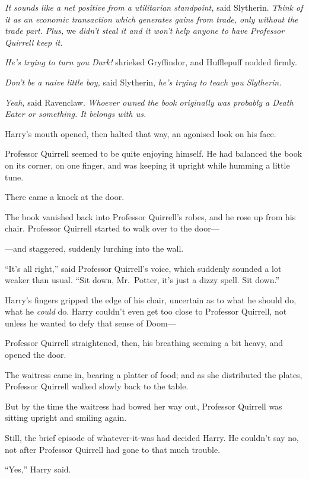 \emph{It sounds like a net positive from a utilitarian standpoint,} said
Slytherin. \emph{Think of it as an economic transaction which generates
gains from trade, only without the trade part.} \emph{Plus,} we
\emph{didn't steal it and it won't help anyone to have Professor
Quirrell keep it.}

\emph{He's trying to turn you Dark!} shrieked Gryffindor, and Hufflepuff
nodded firmly.

\emph{Don't be a naive little boy,} said Slytherin, \emph{he's trying to
teach you Slytherin.}

\emph{Yeah,} said Ravenclaw. \emph{Whoever owned the book originally was
probably a Death Eater or something. It belongs with us.}

Harry's mouth opened, then halted that way, an agonised look on his
face.

Professor Quirrell seemed to be quite enjoying himself. He had balanced
the book on its corner, on one finger, and was keeping it upright while
humming a little tune.

There came a knock at the door.

The book vanished back into Professor Quirrell's robes, and he rose up
from his chair. Professor Quirrell started to walk over to the door---

---and staggered, suddenly lurching into the wall.

``It's all right,'' said Professor Quirrell's voice, which suddenly
sounded a lot weaker than usual. ``Sit down, Mr.~Potter, it's just a
dizzy spell. Sit down.''

Harry's fingers gripped the edge of his chair, uncertain as to what he
should do, what he \emph{could} do. Harry couldn't even get too close to
Professor Quirrell, not unless he wanted to defy that sense of Doom---

Professor Quirrell straightened, then, his breathing seeming a bit
heavy, and opened the door.

The waitress came in, bearing a platter of food; and as she distributed
the plates, Professor Quirrell walked slowly back to the table.

But by the time the waitress had bowed her way out, Professor Quirrell
was sitting upright and smiling again.

Still, the brief episode of whatever-it-was had decided Harry. He
couldn't say no, not after Professor Quirrell had gone to that much
trouble.

``Yes,'' Harry said.

